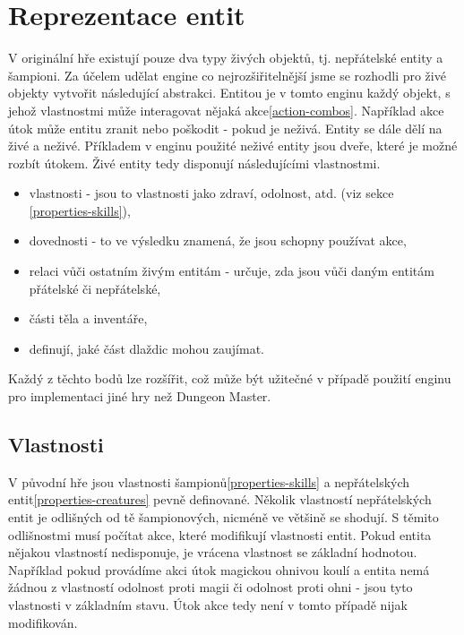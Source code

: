 \section{Reprezentace entit}

V originální hře existují pouze dva typy živých objektů, tj. nepřátelské entity a šampioni. Za účelem udělat engine
co nejrozšiřitelnější jsme se rozhodli pro živé objekty vytvořit následující abstrakci.  
Entitou je v tomto enginu každý objekt, s jehož vlastnostmi může interagovat nějaká akce\vref{action-combos}. Například akce
útok může entitu zranit nebo poškodit - pokud je neživá. Entity se dále dělí na živé a neživé. Příkladem v enginu použité neživé entity
jsou dveře, které je možné rozbít útokem. Živé entity tedy disponují následujícími vlastnostmi.

\begin{itemize}
\item vlastnosti - jsou to vlastnosti jako zdraví, odolnost,  atd. (viz sekce \ref{properties-skills}),
\item dovednosti - to ve výsledku znamená, že jsou schopny používat akce,
\item relaci vůči ostatním živým entitám - určuje, zda jsou vůči daným entitám přátelské či nepřátelské,
\item části těla a inventáře,
\item definují, jaké část dlaždic mohou zaujímat.
\end{itemize}

Každý z těchto bodů lze rozšířit, což může být užitečné v případě použití enginu pro implementaci jiné hry než Dungeon Master. 

\subsection{Vlastnosti}

V původní hře jsou vlastnosti šampionů\vref{properties-skills} a nepřátelských entit\vref{properties-creatures} pevně definované. 
Několik vlastností nepřátelských entit je odlišných od tě šampionových, nicméně ve většině se shodují.
S těmito odlišnostmi musí počítat akce, které modifikují vlastnosti entit. Pokud entita nějakou vlastností nedisponuje, je vrácena 
vlastnost se základní hodnotou. Například pokud provádíme akci útok magickou ohnivou koulí a entita nemá žádnou z vlastností
odolnost proti magii či odolnost proti ohni - jsou tyto vlastnosti v základním stavu. Útok akce tedy není v tomto případě
nijak modifikován. 

